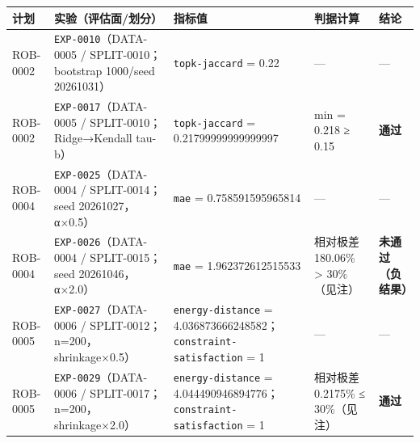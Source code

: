 \documentclass[
  11pt,
]{ctexart}
\newcounter{none} %
\begin{document}
{\def\LTcaptype{none} %
\begin{longtable}[]{@{}
  >{\raggedright\arraybackslash}p{}
  >{\raggedright\arraybackslash}p{}
  >{\raggedright\arraybackslash}p{}
  >{\raggedright\arraybackslash}p{}
  >{\raggedright\arraybackslash}p{}@{}}
\toprule\noalign{}
\begin{minipage}[b]{\linewidth}\raggedright
计划
\end{minipage} & \begin{minipage}[b]{\linewidth}\raggedright
实验（评估面/划分）
\end{minipage} & \begin{minipage}[b]{\linewidth}\raggedright
指标值
\end{minipage} & \begin{minipage}[b]{\linewidth}\raggedright
判据计算
\end{minipage} & \begin{minipage}[b]{\linewidth}\raggedright
结论
\end{minipage} \\
\midrule\noalign{}
\endhead
\bottomrule\noalign{}
\endlastfoot
ROB-0002 & \texttt{EXP-0010}（DATA-0005 / SPLIT-0010；bootstrap
1000/seed 20261031） & \texttt{topk-jaccard} = 0.22 & --- & --- \\
ROB-0002 & \texttt{EXP-0017}（DATA-0005 / SPLIT-0010；Ridge→Kendall
tau-b） & \texttt{topk-jaccard} = 0.21799999999999997 & min = 0.218 ≥
0.15 & \textbf{通过} \\
ROB-0004 & \texttt{EXP-0025}（DATA-0004 / SPLIT-0014；seed
20261027，α×0.5） & \texttt{mae} = 0.758591595965814 & --- & --- \\
ROB-0004 & \texttt{EXP-0026}（DATA-0004 / SPLIT-0015；seed
20261046，α×2.0） & \texttt{mae} = 1.962372612515533 & 相对极差 180.06\%
\textgreater{} 30\%（见注） & \textbf{未通过（负结果）} \\
ROB-0005 & \texttt{EXP-0027}（DATA-0006 /
SPLIT-0012；n=200，shrinkage×0.5） & \texttt{energy-distance} =
4.036873666248582；\texttt{constraint-satisfaction} = 1 & --- & --- \\
ROB-0005 & \texttt{EXP-0029}（DATA-0006 /
SPLIT-0017；n=200，shrinkage×2.0） & \texttt{energy-distance} =
4.044490946894776；\texttt{constraint-satisfaction} = 1 & 相对极差
0.2175\% ≤ 30\%（见注） & \textbf{通过} \\
\end{longtable}
}
\end{document}
